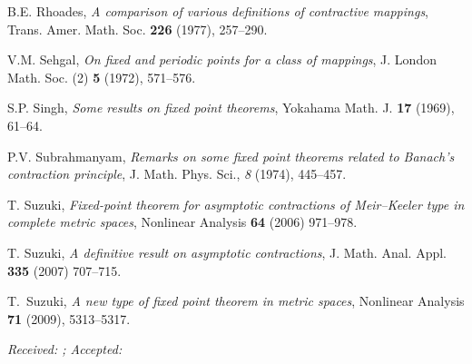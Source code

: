 \documentclass[a4paper,10pt,twoside,reqno]{amsart}
\theoremstyle{definition}
\theoremstyle{remark}
\numberwithin{equation}{section}
\begin{document}
\begin{thebibliography}{99}
  B.E. Rhoades,
  \textit{A comparison of various definitions of contractive mappings},
  Trans. Amer. Math. Soc. \textbf{226} (1977), 257--290.

  V.M. Sehgal,
  \textit{On fixed and periodic points for a class of mappings},
  J. London Math. Soc. (2) \textbf{5} (1972), 571--576.

  S.P. Singh,
  \textit{Some results on fixed point theorems},
  Yokahama Math. J. \textbf{17} (1969), 61--64.

  P.V. Subrahmanyam,
  \textit{Remarks on some fixed point theorems related to Banach's contraction principle},
  J. Math. Phys. Sci., \textit{8} (1974), 445--457.

  T. Suzuki,
  \textit{Fixed-point theorem for asymptotic contractions of
  Meir–Keeler type in complete metric spaces},
  Nonlinear Analysis \textbf{64} (2006) 971--978.

  T. Suzuki,
  \textit{A definitive result on asymptotic contractions},
  J. Math. Anal. Appl. \textbf{335} (2007) 707--715.

  T.~Suzuki,
  \textit{A new type of fixed point theorem in metric spaces},
  Nonlinear Analysis \textbf{71} (2009), 5313--5317.

\end{thebibliography}

\bigskip

{\it Received: ; Accepted: }
\end{document}
